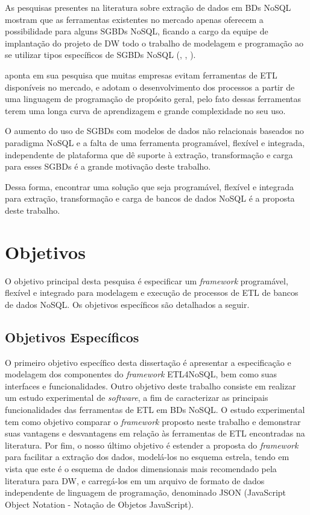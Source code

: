 As pesquisas presentes na literatura sobre extração de dados em BDs NoSQL mostram que as ferramentas existentes no mercado apenas oferecem a possibilidade para alguns SGBDs NoSQL, ficando a cargo da equipe de implantação do projeto de DW todo o trabalho de modelagem e programação ao se utilizar tipos específicos de SGBDs NoSQL (\cite{silva:2016}, \cite{chevalier:2015}, \cite{liu:2013}).

\cite{silva:2012} aponta em sua pesquisa que muitas empresas evitam ferramentas de ETL disponíveis no mercado, e adotam o desenvolvimento dos processos a partir de uma linguagem de programação de propósito geral, pelo fato dessas ferramentas terem uma longa curva de aprendizagem e grande complexidade no seu uso.

O aumento do uso de SGBDs com modelos de dados não relacionais baseados no paradigma NoSQL e a falta de uma ferramenta programável, flexível e integrada, independente de plataforma que dê suporte à extração, transformação e carga para esses SGBDs é a grande motivação deste trabalho.

Dessa forma, encontrar uma solução que seja programável, flexível e integrada para extração, transformação e carga de bancos de dados NoSQL é a proposta deste trabalho.





\section{Objetivos}

O objetivo principal desta pesquisa é especificar um \textit{framework} programável, flexível e integrado para modelagem e execução de processos de ETL de bancos de dados NoSQL. Os objetivos específicos são detalhados a seguir.

\subsection{Objetivos Específicos}

O primeiro objetivo específico desta dissertação é apresentar a especificação e modelagem dos componentes do \textit{framework} ETL4NoSQL, bem como suas interfaces e funcionalidades. Outro objetivo deste trabalho consiste em realizar um estudo experimental de \textit{software}, a fim de caracterizar as principais funcionalidades das ferramentas de ETL em BDs NoSQL. O estudo experimental tem como objetivo comparar o \textit{framework} proposto neste trabalho e demonstrar suas vantagens e desvantagens em relação às ferramentas de ETL encontradas na literatura. Por fim, o nosso último objetivo é estender a proposta do \textit{framework} para facilitar a extração dos dados, modelá-los no esquema estrela, tendo em vista que este é o esquema de dados dimensionais mais recomendado pela literatura para DW, e carregá-los em um arquivo de formato de dados independente de linguagem de programação, denominado JSON (JavaScript Object Notation - Notação de Objetos JavaScript).

